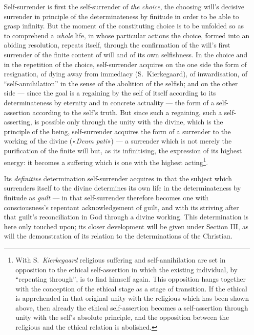 \documentclass[12pt,a4paper]{book}
\begin{document}
Self-surrender is first the self-surrender of \emph{the choice}, the choosing
will's decisive surrender in principle of the determinateness by finitude in
order to be able to grasp infinity. But the moment of the constituting choice
is to be unfolded so as to comprehend a \emph{whole} life, in whose particular
actions the choice, formed into an abiding resolution, repeats itself, through
the confirmation of the will's first surrender of the finite content of will
and of its own selfishness. In the choice and in the repetition of the choice,
self-surrender acquires on the one side the form of resignation, of dying away
from immediacy (S.\ Kierkegaard), of inwardisation, of ``self-annihilation''
in the sense of the abolition of the selfish; and on the other side --- since
the goal is a regaining by the self of itself according to its determinateness
by eternity and in concrete actuality --- the form of a self-assertion
according to the self's
\setcounter{footnote}{0}%
truth. But since such a regaining, such a self-asserting, is possible only
through the unity with the divine, which is the principle of the being,
self-surrender acquires the form of a surrender to the working of the divine
(«\textit{Deum pati}») --- a surrender which is not merely the purification of
the finite will but, as its infinitising, the expression of its highest
energy: it becomes a suffering which is one with the highest
acting\footnote{With S.\ \emph{Kierkegaard} religious suffering and
self-annihilation are set in opposition to the ethical self-assertion in which
the existing individual, by ``repenting through'', is to find himself again.
This opposition hangs together with the conception of the ethical stage as a
stage of transition. If the ethical is apprehended in that original unity with
the religious which has been shown above, then already the ethical
self-assertion becomes a self-assertion through unity with the self's absolute
principle, and the opposition between the religious and the ethical relation
is abolished.}.

Its \emph{definitive} determination self-surrender acquires in that the
subject which surrenders itself to the divine determines its own life in the
determinateness by finitude as \emph{guilt} --- in that self-surrender
therefore becomes one with consciousness's repentant acknowledgement of guilt,
and with its striving after that guilt's reconciliation in God through a
divine working. This determination is here only touched upon; its closer
development will be given under Section III, as will the demonstration of its
relation to the determinations of the Christian.
\end{document}
